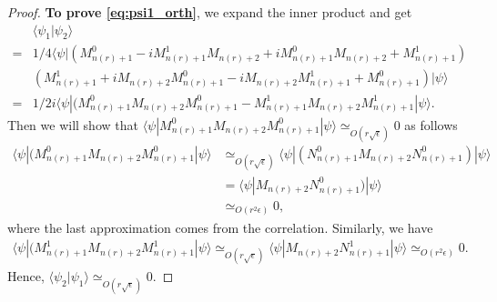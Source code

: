 \documentclass[11pt,letterpaper]{article}
\newcommand{\ket}[1]{|#1\rangle}
\newcommand{\bra}[1]{\langle#1|}
\newcommand{\braket}[2]{\langle#1|#2\rangle}
\newcommand{\1}{\mathbb{1}}
\newcommand{\nr}{n(r)}
\newcommand{\ep}{\epsilon}
\newcommand{\se}{\sqrt{\epsilon}}
\newcommand{\appd}[1]{\simeq_{#1}}
\theoremstyle{definition}
\begin{document}
\begin{proof}
	\textbf{To prove \cref{eq:psi1_orth}}, we expand the inner product and get 
	\begin{align*}
		&\braket{\psi_1}{\psi_2}\\
	 = &1/4\bra{\psi}(M_{\nr+1}^0 - iM_{\nr+1}^1M_{\nr+2} + iM_{\nr+1}^0M_{\nr+2} +M_{\nr+1}^1)\\
	 &(M_{\nr+1}^1 + iM_{\nr+2}M_{\nr+1}^0 -iM_{\nr+2}M_{\nr+1}^1 + M_{\nr+1}^0)\ket{\psi}\\
	 =& 1/2i \bra{\psi}(M_{\nr+1}^0M_{\nr+2}M_{\nr+1}^0-M_{\nr+1}^1M_{\nr+2}M_{\nr+1}^1\ket{\psi}.
	\end{align*}
	Then we will show that $\bra{\psi} M_{\nr+1}^0M_{\nr+2}M_{\nr+1}^0 \ket{\psi} \appd{O( r\se)} 0$ as follows
	\begin{align*}
	 \bra{\psi}(M_{\nr+1}^0M_{\nr+2}M_{\nr+1}^0\ket{\psi} &\appd{O(r\se)}  \bra{\psi}(N_{\nr+1}^0M_{\nr+2}N_{\nr+1}^0)\ket{\psi}\\
	  &=\bra{\psi}M_{\nr+2}N_{\nr+1}^0)\ket{\psi}\\
	&\appd{O(r^2\ep)} 0,
	\end{align*}
	where the last approximation comes from the correlation.
	Similarly, we have 
	\begin{align*}
	\bra{\psi}(M_{\nr+1}^1M_{\nr+2}M_{\nr+1}^1\ket{\psi} \appd{O(r\se)} \bra{\psi} M_{\nr+2}N_{\nr+1}^1 \ket{\psi} \appd{O(r^2\ep)} 0.
	\end{align*}
	Hence, $\braket{\psi_2}{\psi_1} \appd{O(r\se)} 0$.
	

\end{proof}
\end{document}
